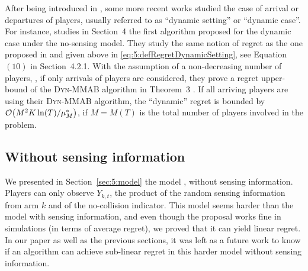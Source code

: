 After being introduced in \cite{Rosenski16}, some more recent works studied the case of arrival or departures of players, usually referred to as ``dynamic setting'' or ``dynamic case''.
For instance, \cite{BoursierPerchet18} studies in Section~4 the first algorithm proposed for the dynamic case under the no-sensing model.
They study the same notion of regret as the one proposed in \cite{Rosenski16} and given above in \eqref{eq:5:defRegretDynamicSetting}, see Equation $(10)$ in Section~4.2.1.
With the assumption of a non-decreasing number of players, \ie, if only arrivals of players are considered,
they prove a regret upper-bound of the \textsc{Dyn-MMAB} algorithm in Theorem~3 .
If all arriving players are using their \textsc{Dyn-MMAB} algorithm, the ``dynamic'' regret is bounded by $\mathop{}\mathopen{}\mathcal{O}\mathopen{}\left(M^2 K \ln(T) / \mu^*_{M}\right)$, if $M=M(T)$ is the total number of players involved in the problem.






\subsection{Without sensing information}
\label{sub:5:withoutSensing}

We presented in Section~\ref{sec:5:model} the model \modeltrois, without sensing information. Players can only observe $Y_{k,t}$, the product of the \iid{} random sensing information from arm $k$ and of the no-collision indicator.
This model seems harder than the model with sensing information, and even though the proposal \Selfish{} works fine in simulations (in terms of average regret), we proved that it can yield linear regret.
In our paper \cite{Besson2018ALT} as well as the previous sections, it was left as a future work to know if an algorithm can achieve sub-linear regret in this harder model without sensing information.

